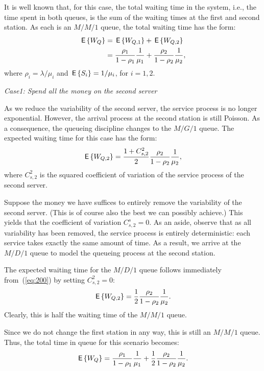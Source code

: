 It is well known that, for this case, the total waiting time in the
system, i.e., the time spent in both queues, is the sum of the waiting
times at the first and second station. As each is an $M/M/1$ queue,
the total waiting time has the form:
\begin{equation}
  \begin{split}
\,\mathsf{E}\left\{W_Q\right\}  &= \,\mathsf{E}\left\{W_{Q,1}\right\} + \,\mathsf{E}\left\{W_{Q,2}\right\} \\
&= \frac{\rho_1}{1-\rho_1} \frac1{\mu_1} + \frac{\rho_2}{1-\rho_2} \frac1{\mu_2},
  \end{split}
\end{equation}
where $\rho_i = \lambda/\mu_i$ and $\,\mathsf{E}\left\{S_i\right\} = 1/\mu_i$, for $i=1,2$. 


\emph{Case1: Spend all the money on the second server} 

As we reduce the variability of the second server, the service process
is no longer exponential. However, the arrival process at the second
station is still Poisson. As a consequence, the queueing discipline
changes to the $M/G/1$ queue. The expected waiting time for this case
has the form:
\begin{equation}\label{eq:200}
\,\mathsf{E}\left\{W_{Q,2}\right\} = \frac{1+C_{s,2}^2}2\frac{\rho_2}{1-\rho_2} \frac1{\mu_2},
\end{equation}
where $C_{s,2}^2$ is the squared coefficient of variation of the
service process of the second server.

Suppose the money we have suffices to entirely remove the variability
of the second server.  (This is of course also the best we can
possibly achieve.) This yields that the coefficient of variation
$C_{s,2}^s = 0$. As an aside, observe that as all variability has been
removed, the service process is entirely deterministic: each service
takes exactly the same amount of time. As a result, we arrive at the
$M/D/1$ queue to model the queueing process at the second station.

The expected waiting time for the $M/D/1$ queue follows immediately
from~(\ref{eq:200}) by setting $C_{s,2}^2 =0$:
\begin{equation}\label{eq:300}
\,\mathsf{E}\left\{W_{Q,2}\right\} = \frac{1}2\frac{\rho_2}{1-\rho_2} \frac1{\mu_2}.
\end{equation}
Clearly, this is half the waiting time of the  $M/M/1$ queue. 

Since we do not change the first station in any way, this is still an
$M/M/1$ queue. Thus, the total time in queue for this scenario becomes:
\begin{equation*}
  \,\mathsf{E}\left\{W_Q\right\}= \frac{\rho_1}{1-\rho_1} \frac1{\mu_1} +
  \frac12\frac{\rho_2}{1-\rho_2} \frac1{\mu_2}. 
\end{equation*}


